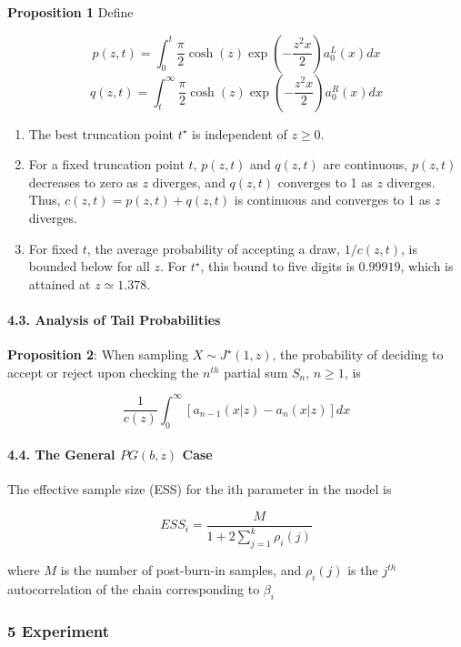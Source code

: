 \documentclass[
]{article}
\begin{document}
\textbf{Proposition 1} Define

\[p(z,t)=\int^t_0 \frac\pi2\cosh(z)\exp\left(-\frac{z^{2}x}2\right)a_0^L(x)dx\]
\[q(z,t)=\int^\infty_t \frac\pi2\cosh(z)\exp\left(-\frac{z^{2}x}2\right)a_0^R(x)dx\]

\begin{enumerate}
\def\labelenumi{\arabic{enumi}.}
\item
  The best truncation point \(t^\star\) is independent of \(z\ge0\).
\item
  For a fixed truncation point \(t\), \(p(z,t)\) and \(q(z,t)\) are
  continuous, \(p(z,t)\) decreases to zero as \(z\) diverges, and
  \(q(z, t)\) converges to 1 as \(z\) diverges. Thus,
  \(c(z,t)= p(z,t) + q(z,t)\) is continuous and converges to 1 as \(z\)
  diverges.
\item
  For fixed \(t\), the average probability of accepting a draw,
  \(1/c(z,t)\), is bounded below for all \(z\). For \(t^\star\), this
  bound to five digits is \(0.99919\), which is attained at
  \(z\simeq1.378.\)
\end{enumerate}

\hypertarget{analysis-of-tail-probabilities}{%
\paragraph{4.3. Analysis of Tail
Probabilities}\label{analysis-of-tail-probabilities}}

\textbf{Proposition 2}: When sampling \(X\sim J^\star(1, z)\), the
probability of deciding to accept or reject upon checking the \(n^{th}\)
partial sum \(S_n\), \(n\ge1\), is

\[\frac1{c(z)}\int^\infty_0 [a_{n-1}(x|z)-a_n(x|z)]dx\]

\hypertarget{the-general-pgb-z-case}{%
\paragraph{\texorpdfstring{4.4. The General \(PG(b, z)\)
Case}{4.4. The General PG(b, z) Case}}\label{the-general-pgb-z-case}}

The effective sample size (ESS) for the ith parameter in the model is

\[ESS_i=\frac{M}{1+2\sum_{j=1}^k\rho_i(j)}\]

where \(M\) is the number of post-burn-in samples, and \(\rho_i(j)\) is
the \(j^{th}\) autocorrelation of the chain corresponding to \(\beta_i\)

\hypertarget{experiment}{%
\subsubsection{5 Experiment}\label{experiment}}
\end{document}
